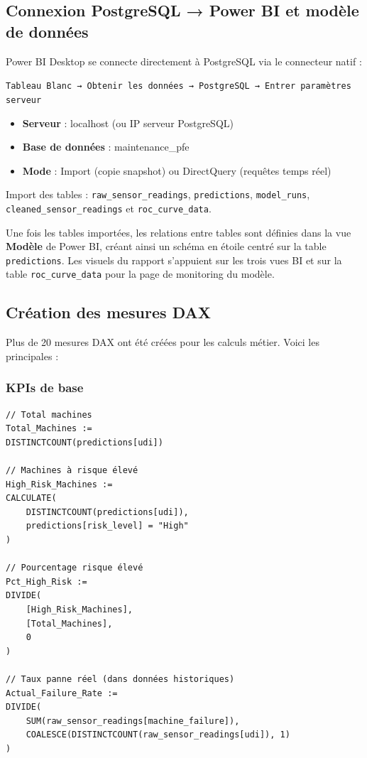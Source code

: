 \documentclass[a4paper,12pt]{report}
\begin{document}
\subsection{Connexion PostgreSQL → Power BI et modèle de données}

Power BI Desktop se connecte directement à PostgreSQL via le connecteur natif :

\texttt{Tableau Blanc → Obtenir les données → PostgreSQL → Entrer paramètres serveur}

\begin{itemize}
    \item \textbf{Serveur} : localhost (ou IP serveur PostgreSQL)
    \item \textbf{Base de données} : maintenance\_pfe
    \item \textbf{Mode} : Import (copie snapshot) ou DirectQuery (requêtes temps réel)
\end{itemize}

Import des tables : \texttt{raw\_sensor\_readings}, \texttt{predictions}, \texttt{model\_runs}, \texttt{cleaned\_sensor\_readings} et \texttt{roc\_curve\_data}.

Une fois les tables importées, les relations entre tables sont définies dans la vue \textbf{Modèle} de Power BI, créant ainsi un schéma en étoile centré sur la table \texttt{predictions}. Les visuels du rapport s'appuient sur les trois vues BI et sur la table \texttt{roc\_curve\_data} pour la page de monitoring du modèle.

\subsection{Création des mesures DAX}

Plus de 20 mesures DAX ont été créées pour les calculs métier. Voici les principales :

\subsubsection{KPIs de base}

\begin{lstlisting}[language=DAX]
// Total machines
Total_Machines := 
DISTINCTCOUNT(predictions[udi])

// Machines à risque élevé
High_Risk_Machines := 
CALCULATE(
    DISTINCTCOUNT(predictions[udi]),
    predictions[risk_level] = "High"
)

// Pourcentage risque élevé
Pct_High_Risk := 
DIVIDE(
    [High_Risk_Machines],
    [Total_Machines],
    0
)

// Taux panne réel (dans données historiques)
Actual_Failure_Rate := 
DIVIDE(
    SUM(raw_sensor_readings[machine_failure]),
    COALESCE(DISTINCTCOUNT(raw_sensor_readings[udi]), 1)
)
\end{lstlisting}
\end{document}
